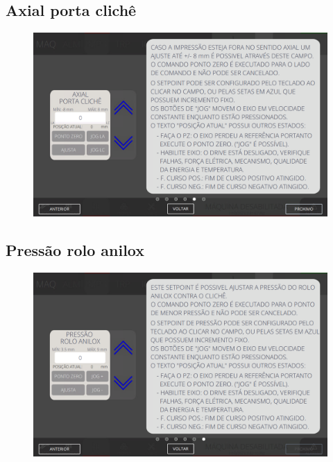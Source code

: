 \newpage
\thispagestyle{fancy}
\vspace{\fill}
\subsection{Axial porta clichê}
\begin{figure}
    \centering
    \includegraphics[width=576 px,height=360 px]{src/imagesICV/04-printters/02-printter/settings/e-5.png}
\end{figure}
\newpage

\thispagestyle{fancy}
\vspace{\fill}
\subsection{Pressão rolo anilox}
\begin{figure}
    \centering
    \includegraphics[width=576 px,height=360 px]{src/imagesICV/04-printters/02-printter/settings/e-6.png}
\end{figure}

